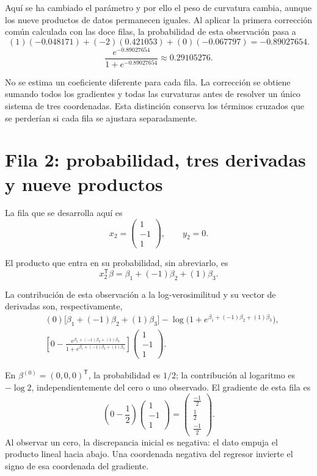 \documentclass[11pt,a4paper]{article}
\newcommand{\T}{^{\mathsf T}}
\begin{document}
Aquí se ha cambiado el parámetro y por ello el peso de
curvatura cambia, aunque los nueve productos de datos
permanecen iguales.
Al aplicar la primera corrección común calculada con las doce filas,
la probabilidad de esta observación pasa a
\[
(1)(-0.048171)+(-2)(0.421053)+(0)(-0.067797)=-0.89027654.
\]
\[
\frac{e^{-0.89027654}}{1+e^{-0.89027654}}\approx0.29105276.
\]

No se estima un coeficiente diferente para cada fila.
La corrección se obtiene sumando todos los gradientes y todas
las curvaturas antes de resolver un único sistema de tres coordenadas.
Esta distinción conserva los términos cruzados que se perderían
si cada fila se ajustara separadamente.

\clearpage
\section{Fila 2: probabilidad, tres derivadas y nueve productos}\label{logit84}
La fila que se desarrolla aquí es
\[
x_{2}=\begin{pmatrix}1\\-1\\1\end{pmatrix},\qquad y_{2}=0.
\]

El producto que entra en su probabilidad, sin abreviarlo, es
\[
x_{2}\T\beta=\beta_1+(-1)\beta_2+(1)\beta_3.
\]

La contribución de esta observación a la log-verosimilitud
y su vector de derivadas son, respectivamente,
\[
\begin{aligned}
&(0)\bigl[\beta_1+(-1)\beta_2+(1)\beta_3\bigr]-\log\bigl(1+e^{\beta_1+(-1)\beta_2+(1)\beta_3}\bigr),\\&\left[0-\frac{e^{\beta_1+(-1)\beta_2+(1)\beta_3}}{1+e^{\beta_1+(-1)\beta_2+(1)\beta_3}}\right]\begin{pmatrix}1\\-1\\1\end{pmatrix}.\end{aligned}
\]

En \(\beta^{(0)}=(0,0,0)\T\), la probabilidad es \(1/2\);
la contribución al logaritmo es \(-\log2\), independientemente
del cero o uno observado. El gradiente de esta fila es
\[
\left(0-\frac12\right)\begin{pmatrix}1\\-1\\1\end{pmatrix}=\begin{pmatrix}\frac{-1}{2}\\\frac{1}{2}\\\frac{-1}{2}\end{pmatrix}.
\]
Al observar un cero, la discrepancia inicial es negativa: el dato empuja el producto lineal hacia abajo. Una coordenada negativa del regresor invierte el signo de esa coordenada del gradiente.
\end{document}
